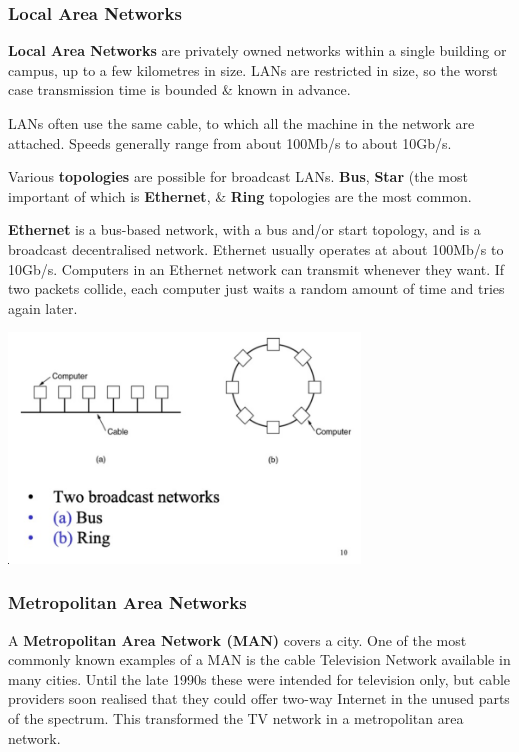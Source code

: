 \documentclass[11pt]{article}
\begin{document}
\newpage
\subsubsection{Local Area Networks}
\textbf{Local Area Networks} are privately owned networks within a single building or campus, up to a few kilometres in size. 
LANs are restricted in size, so the worst case transmission time is bounded \& known in advance. 

LANs often use the same cable, to which all the machine in the network are attached. 
Speeds generally range from about 100Mb/s to about 10Gb/s. 


Various \textbf{topologies} are possible for broadcast LANs. 
\textbf{Bus}, \textbf{Star} (the most important of which is \textbf{Ethernet}, \& \textbf{Ring} topologies are the most common. 

\textbf{Ethernet} is a bus-based network, with a bus and/or start topology, and is a broadcast decentralised network. 
Ethernet usually operates at about 100Mb/s to 10Gb/s. 
Computers in an Ethernet network can transmit whenever they want. 
If two packets collide, each computer just waits a random amount of time and tries again later.

\begin{center}
    \includegraphics[width=0.7\textwidth]{lan-diagram.png}
\end{center}

\newpage
\subsubsection{Metropolitan Area Networks}
A \textbf{Metropolitan Area Network (MAN)} covers a city. 
One of the most commonly known examples of a MAN is the cable Television Network available in many cities. 
Until the late 1990s these were intended for television only, but cable providers soon realised that they could offer two-way 
Internet in the unused parts of the spectrum. 
This transformed the TV network in a metropolitan area network. 
\end{document}
